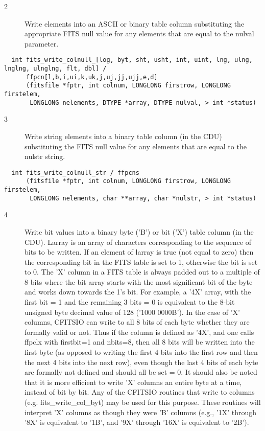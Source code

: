 \documentclass[11pt]{book}
\begin{document}
\begin{description}
\item[2 ] Write elements into an ASCII or binary table column
    substituting the appropriate FITS null value for any elements that
    are equal to the nulval parameter.    \label{ffpcnx}
\end{description}

\begin{verbatim}
  int fits_write_colnull_[log, byt, sht, usht, int, uint, lng, ulng, lnglng, ulnglng, flt, dbl] /
      ffpcn[l,b,i,ui,k,uk,j,uj,jj,ujj,e,d]
      (fitsfile *fptr, int colnum, LONGLONG firstrow, LONGLONG firstelem,
       LONGLONG nelements, DTYPE *array, DTYPE nulval, > int *status)
\end{verbatim}

\begin{description}
\item[3 ] Write string elements into a binary table column (in the CDU)
    substituting the FITS null value for any elements that
   are equal to the nulstr string.  \label{ffpcns}
\end{description}

\begin{verbatim}
  int fits_write_colnull_str / ffpcns
      (fitsfile *fptr, int colnum, LONGLONG firstrow, LONGLONG firstelem,
       LONGLONG nelements, char **array, char *nulstr, > int *status)
\end{verbatim}

\begin{description}
\item[4 ] Write bit values into a binary byte ('B') or bit ('X') table column (in
    the CDU).  Larray is an array of characters corresponding to the
    sequence of bits to be written.  If an element of larray is true
    (not equal to zero) then the corresponding bit in the FITS table is
    set to 1, otherwise the bit is set to 0.  The 'X' column in a FITS
    table is always padded out to a multiple of 8 bits where the bit
    array starts with the most significant bit of the byte and works
    down towards the 1's bit.  For example, a '4X' array, with the
    first bit = 1 and the remaining 3 bits = 0 is equivalent to the 8-bit
    unsigned byte decimal value of 128  ('1000 0000B').  In the case of
    'X' columns, CFITSIO can write to all 8 bits of each byte whether
    they are formally valid or not.  Thus if the column is defined as
    '4X', and one calls ffpclx with firstbit=1 and nbits=8, then all
    8 bits will be written into the first byte (as opposed to writing
    the first 4 bits into the first row and then the next 4 bits into
    the next row), even though the last 4 bits of each byte are formally
    not defined and should all be set = 0.  It should also be noted that
    it is more efficient to write 'X' columns an entire byte at a time,
    instead of bit by bit.  Any of the CFITSIO routines that write to
    columns (e.g. fits\_write\_col\_byt) may be used for this purpose.
    These routines will interpret 'X' columns as though they were 'B'
    columns (e.g.,  '1X' through '8X' is equivalent
   to '1B', and '9X' through '16X' is equivalent to '2B').  \label{ffpclx}
\end{description}
\end{document}
